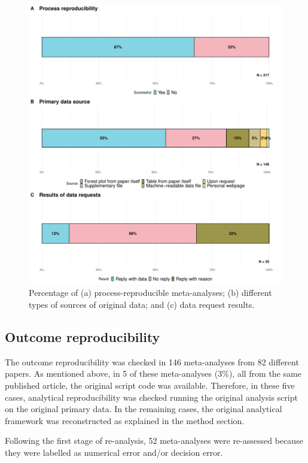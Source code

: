 \documentclass[
  ,apa7,floatsintext]{apa6}
\begin{document}
\begin{figure}
\includegraphics[width=1\linewidth]{manuscript_files/figure-latex/unnamed-chunk-3-1} \caption{Percentage of (a) process-reproducible meta-analyses; (b) different types of sources of original data; and (c) data request results.}\label{fig:unnamed-chunk-3}
\end{figure}

\hypertarget{outcome-reproducibility}{%
\subsection{Outcome reproducibility}\label{outcome-reproducibility}}

The outcome reproducibility was checked in 146 meta-analyses from 82 different papers. As mentioned above, in 5 of these meta-analyses (3\%), all from the same published article, the original script code was available. Therefore, in these five cases, analytical reproducibility was checked running the original analysis script on the original primary data. In the remaining cases, the original analytical framework was reconstructed as explained in the method section.

Following the first stage of re-analysis, 52 meta-analyses were re-assessed because they were labelled as numerical error and/or decision error.
\end{document}
